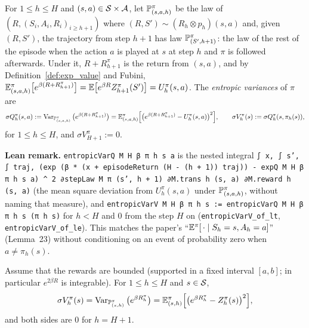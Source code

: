 \begin{definition}\label{def:entropic_variance}
\leanok
{}
For $1 \le h \le H$ and $(s, a) \in \mathcal{S} \times \mathcal{A}$, let $\mathbb{P}^\pi_{(s,a,h)}$ be the law of
$(R, (S_i, A_i, R_i)_{i \ge h+1})$ where $(R, S') \sim (R_h \otimes p_h)(s, a)$ and, given
$(R, S')$, the trajectory from step $h + 1$ has law $\mathbb{P}^\pi_{(S', h+1)}$: the law of the
rest of the episode when the action $a$ is played at $s$ at step $h$ and $\pi$ is followed
afterwards. Under it, $R + R^\pi_{h+1}$ is the return from $(s, a)$, and by
Definition~\ref{def:exp_value} and Fubini,
$\mathbb{E}^\pi_{(s,a,h)}\big[e^{\beta(R + R^\pi_{h+1})}\big] = \mathbb{E}\big[e^{\beta R}Z^\pi_{h+1}(S')\big] = U^\pi_h(s,a)$.
The \emph{entropic variances} of $\pi$ are
\[
  \sigma Q^\pi_h(s, a) := \operatorname{Var}_{\mathbb{P}^\pi_{(s,a,h)}}\big(e^{\beta(R + R^\pi_{h+1})}\big)
  = \mathbb{E}^\pi_{(s,a,h)}\Big[\big(e^{\beta(R + R^\pi_{h+1})} - U^\pi_h(s,a)\big)^2\Big],
  \qquad
  \sigma V^\pi_h(s) := \sigma Q^\pi_h(s, \pi_h(s)),
\]
for $1 \le h \le H$, and $\sigma V^\pi_{H+1} := 0$.
\end{definition}

\textbf{Lean remark.} \texttt{entropicVarQ M H β π h s a} is the nested integral
\texttt{∫ x, ∫ s', ∫ traj, (exp (β * (x + episodeReturn (H - (h + 1)) traj)) - expQ M H β π h s a) \^{} 2 ∂stepLaw M π (s', h + 1) ∂M.trans h (s, a) ∂M.reward h (s, a)}
(the mean square deviation from $U^\pi_h(s,a)$ under $\mathbb{P}^\pi_{(s,a,h)}$, without naming that
measure), and \texttt{entropicVarV M H β π h s := entropicVarQ M H β π h s (π h s)} for $h < H$ and
$0$ from the step $H$ on (\texttt{entropicVarV\_of\_lt}, \texttt{entropicVarV\_of\_le}). This matches the
paper's ``$\mathbb{E}^\pi[\,\cdot \mid S_h = s, A_h = a]$'' (Lemma~23) without conditioning on an event
of probability zero when $a \ne \pi_h(s)$.

\begin{lemma}\label{lem:pmdp_entropic_variance_V}
\leanok
{}
Assume that the rewards are bounded (supported in a fixed interval $[a, b]$; in particular
$e^{2\beta R}$ is integrable). For $1 \le h \le H$ and $s \in \mathcal{S}$,
\[
  \sigma V^\pi_h(s) = \operatorname{Var}_{\mathbb{P}^\pi_{(s,h)}}\big(e^{\beta R^\pi_h}\big)
  = \mathbb{E}^\pi_{(s,h)}\Big[\big(e^{\beta R^\pi_h} - Z^\pi_h(s)\big)^2\Big] ,
\]
and both sides are $0$ for $h = H + 1$.
\end{lemma}

